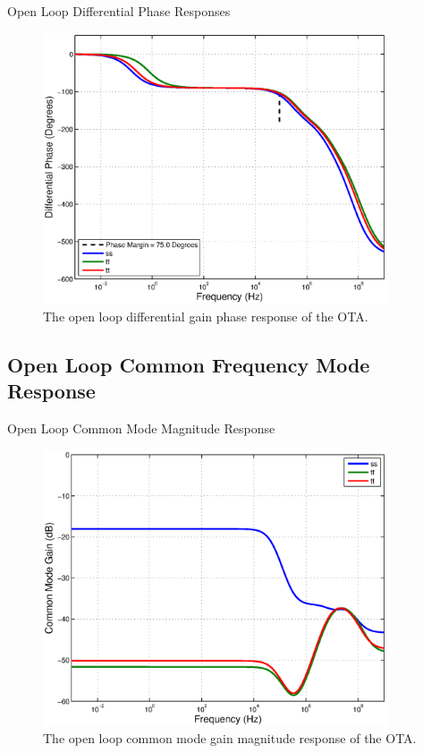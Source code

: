 \documentclass[journal]{IEEEtran}
\begin{document}
Open Loop Differential Phase Responses
\begin{figure}
\centering
\includegraphics[width=4in]{Plots/open_dm_phase.eps}
\caption{The open loop differential gain phase response of the OTA.}
\label{fig:open_dm_phase}
\end{figure}

\subsection{Open Loop Common Frequency Mode Response}

Open Loop Common Mode Magnitude Response
\begin{figure}
\centering
\includegraphics[width=4in]{Plots/open_cm_gain.eps}
\caption{The open loop common mode gain magnitude response of the OTA.}
\label{fig:open_cm_gain}
\end{figure}
\end{document}
